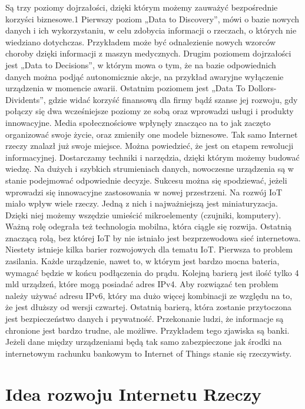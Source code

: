 \documentclass[brudnopis]{xmgr}
\begin{document}
Są trzy poziomy dojrzałości, dzięki którym możemy zauważyć bezpośrednie korzyści biznesowe.1
Pierwszy poziom „Data to Discovery”, mówi o bazie nowych danych i ich wykorzystaniu, w celu  zdobycia informacji o rzeczach, o których nie wiedziano dotychczas. Przykładem może być odnalezienie nowych wzorców choroby dzięki informacji z maszyn medycznych. 
Drugim poziomem dojrzałości jest „Data to Decisions”, w którym mowa o tym, że na bazie odpowiednich danych można podjąć autonomicznie akcje, na przykład awaryjne wyłączenie urządzenia w momencie awarii. 
Ostatnim poziomem jest „Data To Dollors-Dividents”, gdzie widać korzyść finansową dla firmy bądź szanse jej rozwoju, gdy połączy się dwa wcześniejsze poziomy ze sobą oraz wprowadzi usługi i produkty innowacyjne. 
Media społecznościowe wpłynęły znacząco na to jak zaczęto organizować swoje życie, oraz zmieniły one modele biznesowe. Tak samo Internet rzeczy znalazł już swoje miejsce. Można powiedzieć, że jest on etapem rewolucji informacyjnej. Dostarczamy techniki i narzędzia, dzięki którym możemy budować wiedzę. Na dużych i szybkich strumieniach danych, nowoczesne urządzenia są w stanie podejmować odpowiednie decyzje. Sukcesu można się spodziewać, jeżeli wprowadzi się innowacyjne zastosowania w nowej przestrzeni. 
Na rozwój IoT miało wpływ wiele rzeczy. Jedną z nich i najważniejszą jest miniaturyzacja. Dzięki niej możemy wszędzie umieścić mikroelementy (czujniki, komputery). Ważną rolę odegrała też technologia mobilna, która ciągle się rozwija. Ostatnią znaczącą rolą, bez której IoT by nie istniało jest bezprzewodowa sieć internetowa. 
Niestety istnieje kilka barier rozwojowych dla tematu IoT. Pierwsza to problem zasilania. Każde urządzenie, nawet to, w którym jest bardzo mocna bateria, wymagać będzie w końcu podłączenia do prądu. Kolejną barierą jest ilość tylko 4 mld urządzeń, które mogą posiadać adres IPv4. Aby rozwiązać ten problem należy używać adresu IPv6, który ma dużo więcej kombinacji ze względu na to, że jest dłuższy od wersji czwartej. Ostatnią barierą, która zostanie przytoczona jest bezpieczeństwo danych i prywatność. Przekonanie ludzi, że informacje są chronione jest bardzo trudne, ale możliwe. Przykładem tego zjawiska są banki. Jeżeli dane między urządzeniami będą tak samo zabezpieczone jak środki na internetowym rachunku bankowym to Internet of Things stanie się rzeczywisty. 

\section{Idea rozwoju Internetu Rzeczy}
\end{document}
